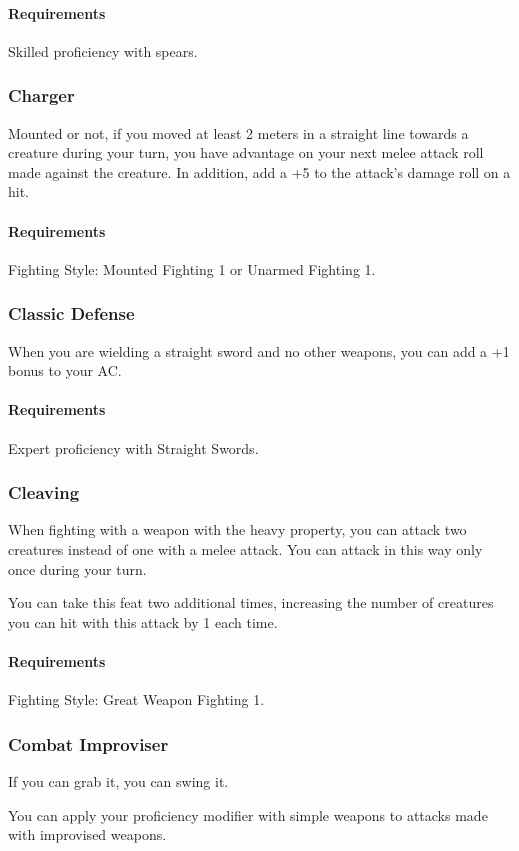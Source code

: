     \paragraph{Requirements} Skilled proficiency with spears.
\subsubsection{Charger} \label{feat::charger}
    Mounted or not, if you moved at least 2 meters in a straight line towards a creature during your turn, you have advantage on your next melee attack roll made against the creature.
    In addition, add a +5 to the attack's damage roll on a hit.
    \paragraph{Requirements} Fighting Style: Mounted Fighting 1 or Unarmed Fighting 1.
\subsubsection{Classic Defense} \label{feat::classicdefense}
    When you are wielding a straight sword and no other weapons, you can add a +1 bonus to your AC.
    \paragraph{Requirements} Expert proficiency with Straight Swords.
\subsubsection{Cleaving} \label{feat::cleaving}
    When fighting with a weapon with the heavy property, you can attack two creatures instead of one with a melee attack.
    You can attack in this way only once during your turn.

    You can take this feat two additional times, increasing the number of creatures you can hit with this attack by 1 each time.
    \paragraph{Requirements} Fighting Style: Great Weapon Fighting 1.
\subsubsection{Combat Improviser} \label{feat::combatimproviser}
    If you can grab it, you can swing it.

    You can apply your proficiency modifier with simple weapons to attacks made with improvised weapons.

